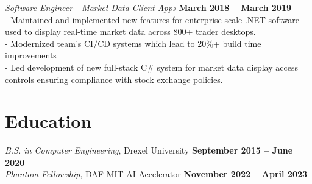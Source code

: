 \documentclass[margin,line]{resume}
\begin{document}
\begin{resume}
    \textsl{Software Engineer - Market Data Client Apps} \hfill \textbf{March 2018 -- March 2019}\\
    - Maintained and implemented new features for enterprise scale .NET software used to display real-time market data across 800+ trader desktops.\vspace{1mm}\\%
    - Modernized team's CI/CD systems which lead to 20\%+ build time improvements\vspace{1mm}\\%
    - Led development of new full-stack C\# system for market data display access controls ensuring compliance with stock exchange policies.
 
    \section{\mysidestyle Education}

    \textsl{B.S. in Computer Engineering}, Drexel University \hfill \textbf{ September 2015 -- June 2020}\\\vspace{-1mm}%
    \textsl{Phantom Fellowship}, DAF-MIT AI Accelerator \hfill \textbf{ November 2022 -- April 2023 }\\\vspace{-2mm}%







\end{resume}
\end{document}
